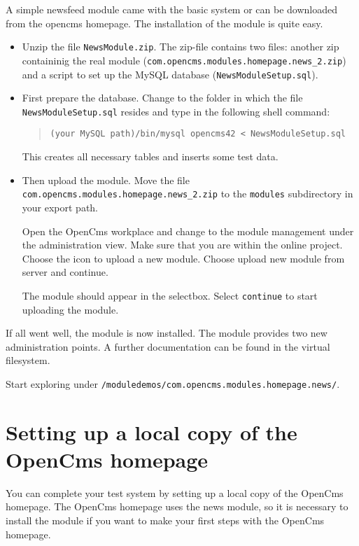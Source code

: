 A simple newsfeed module came with the basic system or can be downloaded
from the opencms homepage. The installation of the module is quite easy.

\begin{itemize}
\item Unzip the file \texttt{NewsModule.zip}.
The zip-file contains two files: another zip containinig the real module 
(\texttt{com.opencms.modules.homepage.news\_2.zip})
and a script to set up the MySQL database (\texttt{NewsModuleSetup.sql}).

\item
First prepare the database.
Change to the folder in which the file \\
\texttt{NewsModuleSetup.sql} resides and type in the following shell command:

\begin{quote}
\texttt{(your MySQL path)/bin/mysql opencms42 < NewsModuleSetup.sql}
\end{quote}

This creates all necessary tables and inserts some test data.

\item Then upload the module.
Move the file \\
\texttt{com.opencms.modules.homepage.news\_2.zip} to the \texttt{modules}
subdirectory in your export path.

Open the OpenCms workplace and change to the module management under the
administration view.
Make sure that you are within the online project.
Choose the icon to upload a new module.
Choose upload new module from server and continue.

The module should appear in the selectbox. 
Select \texttt{continue} to start uploading the module.
\end{itemize}

If all went well, the module is now installed.
The module provides two new administration points. A further documentation
can be found in the virtual filesystem. 

Start exploring under \texttt{/moduledemos/com.opencms.modules.homepage.news/}. 


\section{Setting up a local copy of the OpenCms homepage}
You can complete your test system by setting up a local copy of the OpenCms homepage.
The OpenCms homepage uses the news module, so it is necessary to install the module if
you want to make your first steps with the OpenCms homepage.

